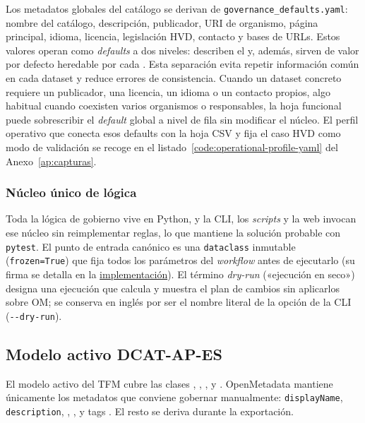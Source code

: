 Los metadatos globales del catálogo se derivan de \texttt{governance\_defaults.yaml}: nombre del catálogo, descripción, publicador, URI de organismo, página principal, idioma, licencia, legislación HVD, contacto y bases de URLs. Estos valores operan como \emph{defaults} a dos niveles: describen el  y, además, sirven de valor por defecto heredable por cada . Esta separación evita repetir información común en cada dataset y reduce errores de consistencia. Cuando un dataset concreto requiere un publicador, una licencia, un idioma o un contacto propios, algo habitual cuando coexisten varios organismos o responsables, la hoja funcional puede sobrescribir el \emph{default} global a nivel de fila sin modificar el núcleo. El perfil operativo que conecta esos defaults con la hoja \ac{CSV} y fija el caso \ac{HVD} como modo de validación se recoge en el listado~\ref{code:operational-profile-yaml} del Anexo~\ref{ap:capturas}.

\subsubsection{Núcleo único de lógica}

Toda la lógica de gobierno vive en Python, y la \ac{CLI}, los \emph{scripts} y la web invocan ese núcleo sin reimplementar reglas, lo que mantiene la solución probable con \texttt{pytest}. El punto de entrada canónico es una \texttt{dataclass} inmutable (\texttt{frozen=True}) que fija todos los parámetros del \emph{workflow} antes de ejecutarlo (su firma se detalla en la \hyperref[cap:implementacion]{implementación}). El término \emph{dry-run} («ejecución en seco») designa una ejecución que calcula y muestra el plan de cambios sin aplicarlos sobre \ac{OM}; se conserva en inglés por ser el nombre literal de la opción de la \ac{CLI} (\texttt{-{}-dry-run}).

\subsection{Modelo activo DCAT-AP-ES}

El modelo activo del TFM cubre las clases , , ,  y . OpenMetadata mantiene únicamente los metadatos que conviene gobernar manualmente: \texttt{displayName}, \texttt{description}, , ,  y tags . El resto se deriva durante la exportación.

